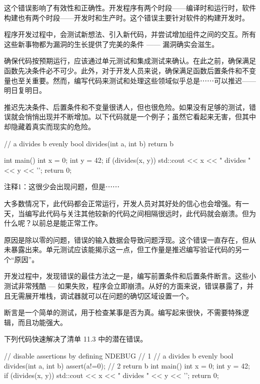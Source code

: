 这个错误影响了有效性和正确性。开发程序有两个时段——编译时和运行时，软件构建也有两个时段——开发时和生产时。这个错误主要针对软件的构建开发时。


程序开发过程中，会测试新想法、引入新代码，并尝试增加组件之间的交互。所有这些新事物都为漏洞的生长提供了完美的条件 —— 漏洞确实会滋生。

确保代码按预期运行，应该通过单元测试和集成测试来确认。在此之前，确保满足函数先决条件必不可少。此外，对于开发人员来说，确保满足函数后置条件和不变量也至关重要。然而，编写代码来测试和处理这些领域似乎总是⋯⋯可以推迟——明日复明日。

推迟先决条件、后置条件和不变量很诱人，但也很危险。如果没有足够的测试，错误就会悄悄出现并不断增加。以下代码就是一个例子；虽然它看起来无害，但其中却隐藏着真实而现实的危险。


\begin{cpp}
// a divides b evenly
bool divides(int a, int b) {
  return b %
}

int main() {
  int x = 0;
  int y = 42;
  if (divides(x, y))
    std::cout << x << " divides " << y << '\n';
  return 0;
}
\end{cpp}

{\footnotesize
注释1：这很少会出现问题，但是⋯⋯
}

大多数情况下，此代码都会正常运行，开发人员对其好处的信心也会增强。有一天，当编写此代码与关注其他较新的代码之间相隔很远时，此代码就会崩溃。但为什么呢？以前总是能正常工作。


原因是除以零的问题，错误的输入数据会导致问题浮现。这个错误一直存在，但从未暴露出来。单元测试应该能揭示这一点，但工作量是推迟编写验证代码的另一个“原因”。


开发过程中，发现错误的最佳方法之一是，编写前置条件和后置条件断言。这些小测试非常残酷 — 如果失败，程序会立即崩溃。从好的方面来说，错误暴露了，并且无需展开堆栈，调试器就可以在问题的确切区域设置一个。

断言是一个简单的测试，用于检查某事是否为真。编写起来很快，不需要特殊逻辑，而且功能强大。

下列代码快速解决了清单 11.3 中的潜在错误。


\begin{cpp}
// disable assertions by defining NDEBUG // 1
// a divides b evenly
bool divides(int a, int b) {
  assert(a!=0); // 2
  return b %
}
int main() {
  int x = 0;
  int y = 42;
  if (divides(x, y))
    std::cout << x << " divides " << y << '\n';
  return 0;
}
\end{cpp}

